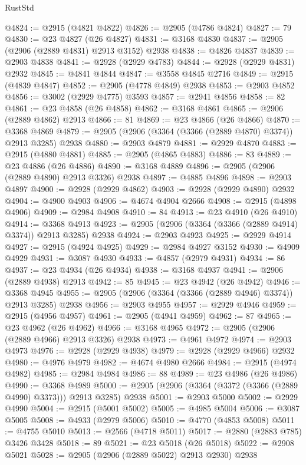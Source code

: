 \begin{lexlean}{RustStd}
\begin{coremodule}
{\begin{coremodule}
{{{{{{{{{{{{{{{{{{{{{{{{{{{{{{{{{{{{{{{{{{{{{{{{{{{{{{{{{{{{{{{{{{{{{{{{{{{{{{@4824 := @2915 (@4821 @4822)
@4826 := @2905 (@4786 @4824)
@4827 := 79
@4830 := @23 @4827 (@26 @4827)
@4831 := @3168 @4830
@4837 := @2905 (@2906 (@2889 @4831) @2913 @3152) @2938
@4838 := @4826 @4837
@4839 := @2903 @4838
@4841 := @2928 (@2929 @4783)
@4844 := @2928 (@2929 @4831) @2932
@4845 := @4841 @4844
@4847 := @3558 @4845 @2716
@4849 := @2915 (@4839 @4847)
@4852 := @2905 (@4778 @4849) @2938
@4853 := @2903 @4852
@4856 := @3002 (@2929 @4775) @3593
@4857 := @2941 @4856
@4858 := 82
@4861 := @23 @4858 (@26 @4858)
@4862 := @3168 @4861
@4865 := @2906 (@2889 @4862) @2913
@4866 := 81
@4869 := @23 @4866 (@26 @4866)
@4870 := @3368 @4869
@4879 := @2905 (@2906 (@3364 (@3366 (@2889 @4870) @3374)) @2913 @3285) @2938
@4880 := @2903 @4879
@4881 := @2929 @4870
@4883 := @2915 (@4880 @4881)
@4885 := @2905 (@4865 @4883)
@4886 := 83
@4889 := @23 @4886 (@26 @4886)
@4890 := @3168 @4889
@4896 := @2905 (@2906 (@2889 @4890) @2913 @3326) @2938
@4897 := @4885 @4896
@4898 := @2903 @4897
@4900 := @2928 (@2929 @4862)
@4903 := @2928 (@2929 @4890) @2932
@4904 := @4900 @4903
@4906 := @4674 @4904 @2666
@4908 := @2915 (@4898 @4906)
@4909 := @2984 @4908
@4910 := 84
@4913 := @23 @4910 (@26 @4910)
@4914 := @3368 @4913
@4923 := @2905 (@2906 (@3364 (@3366 (@2889 @4914) @3374)) @2913 @3285) @2938
@4924 := @2903 @4923
@4925 := @2929 @4914
@4927 := @2915 (@4924 @4925)
@4929 := @2984 @4927 @3152
@4930 := @4909 @4929
@4931 := @3087 @4930
@4933 := @4857 (@2979 @4931)
@4934 := 86
@4937 := @23 @4934 (@26 @4934)
@4938 := @3168 @4937
@4941 := @2906 (@2889 @4938) @2913
@4942 := 85
@4945 := @23 @4942 (@26 @4942)
@4946 := @3368 @4945
@4955 := @2905 (@2906 (@3364 (@3366 (@2889 @4946) @3374)) @2913 @3285) @2938
@4956 := @2903 @4955
@4957 := @2929 @4946
@4959 := @2915 (@4956 @4957)
@4961 := @2905 (@4941 @4959)
@4962 := 87
@4965 := @23 @4962 (@26 @4962)
@4966 := @3168 @4965
@4972 := @2905 (@2906 (@2889 @4966) @2913 @3326) @2938
@4973 := @4961 @4972
@4974 := @2903 @4973
@4976 := @2928 (@2929 @4938)
@4979 := @2928 (@2929 @4966) @2932
@4980 := @4976 @4979
@4982 := @4674 @4980 @2666
@4984 := @2915 (@4974 @4982)
@4985 := @2984 @4984
@4986 := 88
@4989 := @23 @4986 (@26 @4986)
@4990 := @3368 @4989
@5000 := @2905 (@2906 (@3364 (@3372 (@3366 (@2889 @4990) @3373))) @2913 @3285) @2938
@5001 := @2903 @5000
@5002 := @2929 @4990
@5004 := @2915 (@5001 @5002)
@5005 := @4985 @5004
@5006 := @3087 @5005
@5008 := @4933 (@2979 @5006)
@5010 := @4770 (@4853 @5008)
@5011 := @4755 @5010
@5013 := @2566 (@4718 @5011)
@5017 := @2880 (@2883 @785) @3426 @3428
@5018 := 89
@5021 := @23 @5018 (@26 @5018)
@5022 := @2908 @5021
@5028 := @2905 (@2906 (@2889 @5022) @2913 @2930) @2938
}}}}}}}}}}}}}}}}}}}}}}}}}}}}}}}}}}}}}}}}}}}}}}}}}}}}}}}}}}}}}}}}}}}}}}}}}}}}}}
\end{coremodule}}
\end{coremodule}
\end{lexlean}
